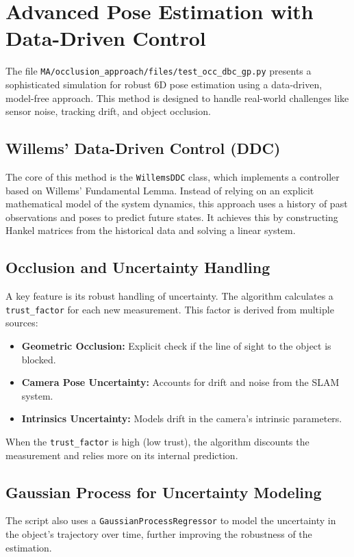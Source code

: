 ﻿\documentclass{article}
\newcommand{\filepath}[1]{\texttt{\small #1}}
\begin{document}
\section{Advanced Pose Estimation with Data-Driven Control}
The file \filepath{MA/occlusion_approach/files/test_occ_dbc_gp.py} presents a sophisticated simulation for robust 6D pose estimation using a data-driven, model-free approach. This method is designed to handle real-world challenges like sensor noise, tracking drift, and object occlusion.

\subsection{Willems' Data-Driven Control (DDC)}
The core of this method is the \texttt{WillemsDDC} class, which implements a controller based on Willems' Fundamental Lemma. Instead of relying on an explicit mathematical model of the system dynamics, this approach uses a history of past observations and poses to predict future states. It achieves this by constructing Hankel matrices from the historical data and solving a linear system.

\subsection{Occlusion and Uncertainty Handling}
A key feature is its robust handling of uncertainty. The algorithm calculates a \texttt{trust_factor} for each new measurement. This factor is derived from multiple sources:
\begin{itemize}
    \item \textbf{Geometric Occlusion:} Explicit check if the line of sight to the object is blocked.
    \item \textbf{Camera Pose Uncertainty:} Accounts for drift and noise from the SLAM system.
    \item \textbf{Intrinsics Uncertainty:} Models drift in the camera's intrinsic parameters.
\end{itemize}
When the \texttt{trust_factor} is high (low trust), the algorithm discounts the measurement and relies more on its internal prediction.

\subsection{Gaussian Process for Uncertainty Modeling}
The script also uses a \texttt{GaussianProcessRegressor} to model the uncertainty in the object's trajectory over time, further improving the robustness of the estimation.
\end{document}
